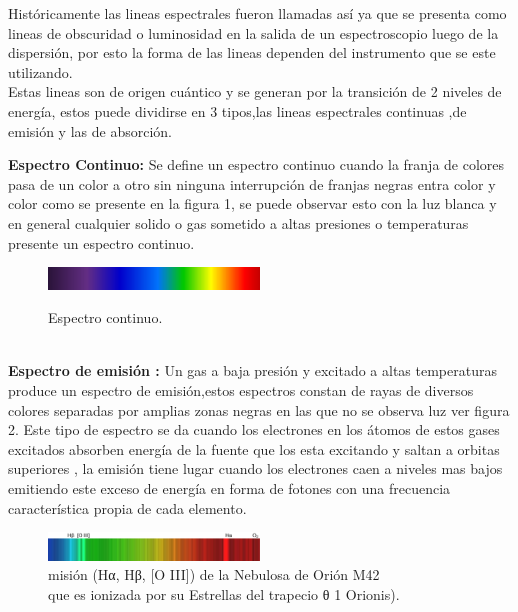 \documentclass[11pt]{article}
\begin{document}
Históricamente las lineas espectrales fueron llamadas así ya que se  presenta como lineas de obscuridad o luminosidad en la salida de un espectroscopio luego de la dispersión, por esto la forma de las lineas dependen del instrumento que se este utilizando.\\
Estas lineas son de origen cuántico y se generan por la transición de 2 niveles de energía, estos puede dividirse en 3 tipos,las lineas espectrales continuas ,de emisión y las de absorción.\cite{troccoli}


\textbf{Espectro Continuo:}
Se define un espectro continuo cuando la franja de colores  pasa de un color a otro sin ninguna interrupción de franjas negras entra color y color como se presente en la figura 1, se puede observar esto con la luz blanca y en general cualquier solido o gas sometido a altas presiones o temperaturas presente un espectro continuo.

\begin{figure}[h]
\caption{Espectro continuo. }
\centering
\includegraphics[width=0.5\textwidth]{1}
\cite{libro}
\end{figure}\\

\textbf{Espectro de emisión :} Un gas a baja presión y excitado a altas temperaturas produce un espectro de emisión,estos espectros constan de rayas de diversos colores separadas por amplias zonas  negras en las que no se observa luz ver figura 2. Este tipo de espectro se da cuando los electrones en los átomos de estos gases excitados absorben energía de la fuente que los esta excitando  y saltan a orbitas superiores , la emisión tiene lugar cuando los electrones caen a niveles mas bajos emitiendo este exceso de energía en forma de fotones con una frecuencia característica propia de cada elemento.

\begin{figure}[h]
\caption{misión (Hα, Hβ, [O III]) de la Nebulosa de Orión M42\\
 que es ionizada por su Estrellas del trapecio θ 1 Orionis).\cite{libro}}
\centering
\includegraphics[width=0.5\textwidth]{2}

\end{figure}\\
\end{document}

